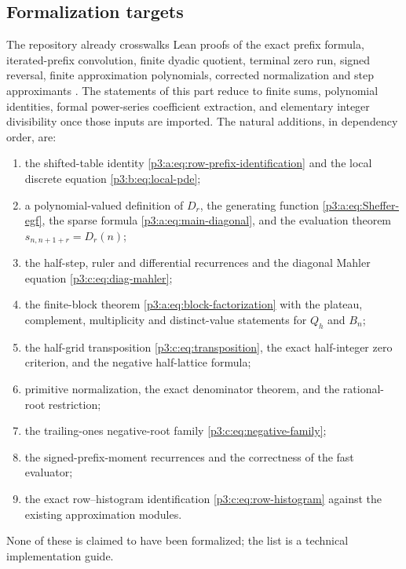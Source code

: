 \documentclass[11pt,oneside]{article}
\numberwithin{equation}{section}
\theoremstyle{definition}
\theoremstyle{remark}
\begin{document}
\subsection{Formalization targets}
The repository already crosswalks Lean proofs of the exact prefix formula,
iterated-prefix convolution, finite dyadic quotient, terminal zero run,
signed reversal, finite approximation polynomials, corrected normalization
and step approximants \cite{p3:proveit-prefix,p3:proveit-approx}. The
statements of this part reduce to finite sums, polynomial identities,
formal power-series coefficient extraction, and elementary integer
divisibility once those inputs are imported. The natural additions, in
dependency order, are:
\begin{enumerate}
\item the shifted-table identity \eqref{p3:a:eq:row-prefix-identification} and
the local discrete equation \eqref{p3:b:eq:local-pde};
\item a polynomial-valued definition of $D_r$, the generating function
\eqref{p3:a:eq:Sheffer-egf}, the sparse formula \eqref{p3:a:eq:main-diagonal}, and
the evaluation theorem $s_{n,n+1+r}=D_r(n)$;
\item the half-step, ruler and differential recurrences and the diagonal
Mahler equation \eqref{p3:c:eq:diag-mahler};
\item the finite-block theorem \eqref{p3:a:eq:block-factorization} with the
plateau, complement, multiplicity and distinct-value statements for $Q_h$
and $B_n$;
\item the half-grid transposition \eqref{p3:c:eq:transposition}, the exact
half-integer zero criterion, and the negative half-lattice formula;
\item primitive normalization, the exact denominator theorem, and the
rational-root restriction;
\item the trailing-ones negative-root family \eqref{p3:c:eq:negative-family};
\item the signed-prefix-moment recurrences and the correctness of the fast
evaluator;
\item the exact row--histogram identification \eqref{p3:c:eq:row-histogram}
against the existing approximation modules.
\end{enumerate}
None of these is claimed to have been formalized; the list is a technical
implementation guide.


\appendix
\end{document}
